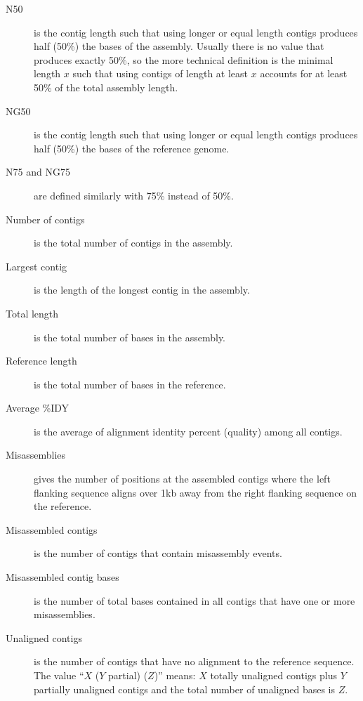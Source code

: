 \documentclass{article}
\begin{document}
\begin{description}
\item[N50] is the contig length such that using longer or equal length contigs
produces half (50\%) the bases of the assembly.  Usually there is no
value that produces exactly 50\%, so the more technical definition is
the minimal length $x$ such that using contigs of length at least $x$ accounts for at least 50\% of the total assembly length.

\item[NG50] is the contig length such that using longer or equal length contigs
produces half (50\%) the bases of the reference genome.

\item[N75 and NG75] are defined similarly with 75\% instead of 50\%.

\item[Number of contigs] is the total number of contigs in the assembly.

\item[Largest contig] is the length of the longest contig in the assembly.

\item[Total length] is the total number of bases in the assembly.

\item[Reference length] is the total number of bases in the reference.

\item[Average \%IDY] is the average of alignment identity percent (quality) among all contigs.

\item[Misassemblies] gives the number of positions at the assembled contigs where the left
flanking sequence aligns over 1kb away from the right flanking sequence on the
reference.

\item[Misassembled contigs] is the number of contigs that contain misassembly
events.

\item[Misassembled contig bases] is the number of total bases contained in all
contigs that have one or more misassemblies.

\item[Unaligned contigs] is the number of contigs that have no alignment to the
reference sequence.  The value ``$X$ ($Y$ partial) ($Z$)'' means:
$X$ totally unaligned contigs
plus $Y$ partially unaligned contigs
and the total number of unaligned bases is $Z$.


\end{description}
\end{document}
